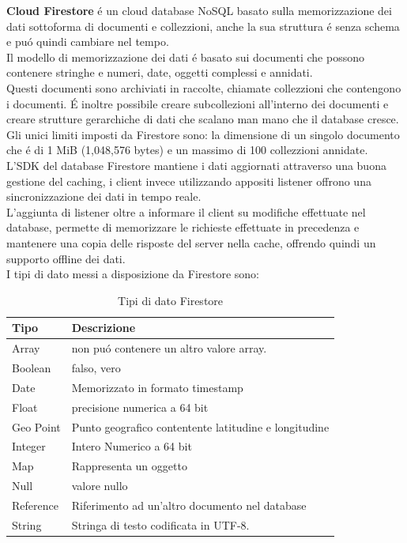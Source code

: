 \textbf{Cloud Firestore} \'e un cloud database NoSQL basato sulla memorizzazione dei dati sottoforma di documenti e collezzioni, anche la sua struttura \'e senza schema e pu\'o quindi cambiare nel tempo.\\
Il modello di memorizzazione dei dati \'e basato sui documenti che possono contenere  stringhe e numeri, date, oggetti complessi e annidati.\\
Questi documenti sono archiviati in raccolte, chiamate collezzioni che contengono i documenti. \'E inoltre possibile creare subcollezioni all'interno dei documenti e creare strutture gerarchiche di dati che scalano man mano che il database cresce.\\
Gli unici limiti imposti da Firestore sono: la dimensione di un singolo documento che \'e di 1 MiB (1,048,576 bytes) e un massimo di 100 collezzioni annidate.\\
L'SDK del database Firestore mantiene i dati aggiornati attraverso una buona gestione del caching, i client invece utilizzando appositi listener offrono una sincronizzazione dei dati in tempo reale.\\
L'aggiunta di listener oltre a informare il client su modifiche effettuate nel database, permette di memorizzare le richieste effettuate in precedenza e mantenere una copia delle risposte del server nella cache, offrendo quindi un supporto offline dei dati.\\

I tipi di dato messi a disposizione da Firestore sono:

\begin{table}[h]
\begin{center}
\begin{tabular}{|p{3cm}|p{10cm}|}
    \hline
\textbf{Tipo} & \textbf{Descrizione} \\ \hline
Array & non pu\'o contenere un altro valore array. \\ \hline
Boolean & falso, vero  \\ \hline
Date & Memorizzato in formato timestamp \\ \hline
Float & precisione numerica a 64 bit \\ \hline
Geo Point & Punto geografico contentente latitudine e longitudine \\ \hline
Integer & Intero Numerico a 64 bit \\ \hline
Map & Rappresenta un oggetto  \\ \hline
Null & valore nullo \\ \hline
Reference & Riferimento ad un'altro documento nel database  \\ \hline
String & Stringa di testo codificata in UTF-8.\\
\hline
\end{tabular}
\caption[Dati Firestore]{Tipi di dato Firestore}\label{tab:Firestore Tipi di dato}
\end{center}
\end{table}

